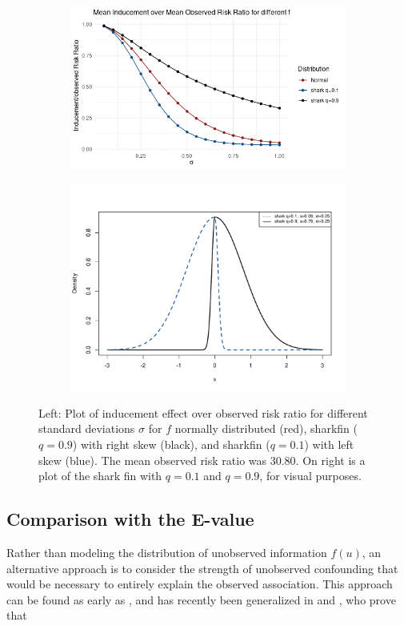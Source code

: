 \documentclass[aoas,preprint, 11pt, dvipsnames, table, x11name]{imsart}
\theoremstyle{remark}
\begin{document}
	
	\begin{figure}[!httb]
		\centering 
		\begin{subfigure}{.5\textwidth}
			\includegraphics[width=7.cm]{induceoverrisk}
		\end{subfigure}%
		\begin{subfigure}{.5\textwidth}
			\includegraphics[width=7.cm]{diff_shark_plots}
		\end{subfigure}
		\caption{Left: Plot of inducement effect over observed risk ratio for different standard deviations $\sigma$ for $f$ normally distributed (red), sharkfin ($q=0.9$) with right skew (black), and sharkfin ($q=0.1$) with left skew (blue). The mean observed risk ratio was 30.80. On right is a plot of the shark fin with $q=0.1$ and $q=0.9$, for visual purposes. }%
		\label{f_explain_plots}
	\end{figure}
	
	
	\subsection{Comparison with the E-value}\label{E-value-comparison}
	Rather than modeling the distribution of unobserved information $f(u)$, an alternative approach is to consider the strength of unobserved confounding that would be necessary to entirely explain the observed association. This approach can be found as early as \cite{Cornfield}, and has recently been generalized in \cite{evalue} and \cite{Peng-2016}, who prove that 
	
\end{document}
